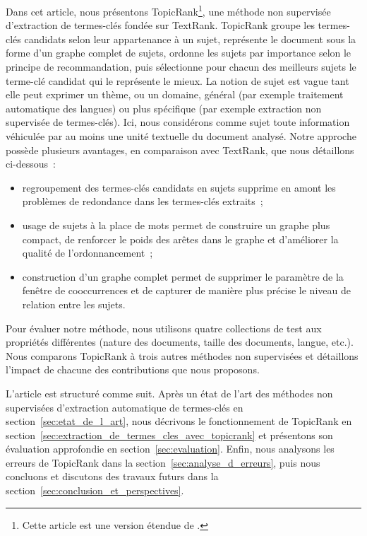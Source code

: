   Dans cet article, nous présentons TopicRank\footnote{Cette article est une
  version étendue de \cite{bougouin2013topicrank}.}, une méthode non supervisée
  d'extraction de termes-clés fondée sur TextRank. TopicRank groupe les
  termes-clés candidats selon leur appartenance à un sujet, représente le
  document sous la forme d'un graphe complet de sujets, ordonne les sujets par
  importance selon le principe de recommandation, puis sélectionne pour chacun
  des meilleurs sujets le terme-clé candidat qui le représente le mieux. La
  notion de sujet est vague tant elle peut exprimer un thème, ou un domaine,
  général (par exemple \og{}traitement automatique des langues\fg{}) ou plus
  spécifique (par exemple \og{}extraction non supervisée de termes-clés\fg{}). Ici,
  nous considérons comme sujet toute information véhiculée par au moins une
  unité textuelle du document analysé. Notre approche possède plusieurs
  avantages, en comparaison avec TextRank, que nous détaillons ci-dessous~:
  \begin{itemize}
    \item{regroupement des termes-clés candidats en sujets supprime en amont
          les problèmes de redondance dans les termes-clés extraits~;}
    \item{usage de sujets à la place de mots permet de construire un graphe
          plus compact, de renforcer le poids des arêtes dans le graphe et
          d'améliorer la qualité de l'ordonnancement~;}
    \item{construction d'un graphe complet permet de supprimer le paramètre
          de la fenêtre de cooccurrences et de capturer de manière plus précise
          le niveau de relation entre les sujets.}
  \end{itemize}

  Pour évaluer notre méthode, nous utilisons quatre collections de test aux
  propriétés différentes (nature des documents, taille des documents, langue,
  etc.). Nous comparons TopicRank à trois autres méthodes non supervisées et
  détaillons l'impact de chacune des contributions que nous proposons.

  L'article est structuré comme suit. Après un état de l'art des méthodes non
  supervisées d'extraction automatique de termes-clés en
  section~\ref{sec:etat_de_l_art}, nous décrivons le fonctionnement de
  Topic\-Rank en section~\ref{sec:extraction_de_termes_cles_avec_topicrank} et
  présentons son évaluation approfondie en section~\ref{sec:evaluation}. Enfin,
  nous analysons les erreurs de TopicRank dans la
  section~\ref{sec:analyse_d_erreurs}, puis nous concluons et discutons des
  travaux futurs dans la section~\ref{sec:conclusion_et_perspectives}.

